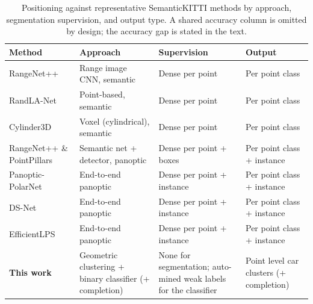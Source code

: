 \documentclass[a4paper,12pt]{report}
\begin{document}
\begin{table}[H]
  \centering
  \caption[Positioning against representative SemanticKITTI methods]{Positioning
    against representative SemanticKITTI methods by approach, segmentation supervision,
    and output type. A shared accuracy column is omitted by design; the accuracy gap is
    stated in the text.}
  \label{tab:positioning}
  \small
  \renewcommand{\arraystretch}{1.25}
  \setlength{\tabcolsep}{5pt}
  \begin{tabular}{@{}p{2.7cm}p{3.7cm}p{3.5cm}p{3.0cm}@{}}
    \toprule
    Method & Approach & Supervision & Output \\
    \midrule
    RangeNet++~\cite{milioto2019rangenet++} & Range image CNN, semantic & Dense per point & Per point class \\
    RandLA-Net~\cite{Hu_2020_CVPR} & Point-based, semantic & Dense per point & Per point class \\
    Cylinder3D~\cite{zhu2021cylindrical} & Voxel (cylindrical), semantic & Dense per point & Per point class \\
    \addlinespace[2pt]
    RangeNet++ \& PointPillars~\cite{behley2021panoptic} & Semantic net + detector, panoptic & Dense per point + boxes & Per point class + instance \\
    Panoptic-PolarNet~\cite{zhou2021panopticpolarnet} & End-to-end panoptic & Dense per point + instance & Per point class + instance \\
    DS-Net~\cite{hong2021dsnet} & End-to-end panoptic & Dense per point + instance & Per point class + instance \\
    EfficientLPS~\cite{sirohi2021efficientlps} & End-to-end panoptic & Dense per point + instance & Per point class + instance \\
    \midrule
    \textbf{This work} & Geometric clustering + binary classifier (+ completion) & None for segmentation; auto-mined weak labels for the classifier & Point level car clusters (+ completion) \\
    \bottomrule
  \end{tabular}
\end{table}
\end{document}
